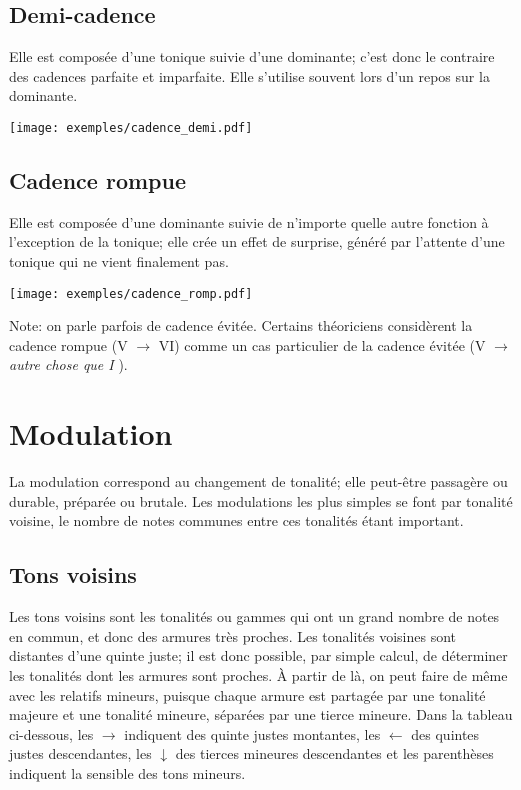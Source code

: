 \documentclass[11pt]{scrreprt}
\begin{document}
\subsection{Demi-cadence}
Elle est composée d'une tonique suivie d'une dominante; c'est donc le contraire des cadences parfaite et imparfaite. Elle s'utilise souvent lors d'un repos sur la dominante.
\begin{center}
   \texttt{[image: exemples/cadence\_demi.pdf]}
\end{center}
\subsection{Cadence rompue}
Elle est composée d'une dominante suivie de n'importe quelle autre fonction à l'exception de la tonique; elle crée un effet de surprise, généré par l'attente d'une tonique qui ne vient finalement pas.
\begin{center}
   \texttt{[image: exemples/cadence\_romp.pdf]}
\end{center}

Note: on parle parfois de cadence évitée. Certains théoriciens considèrent la cadence rompue (V $\to$ VI) comme un cas particulier de la cadence évitée (V $\to$ \emph{autre chose que I} ).
\section{Modulation}
La modulation correspond au changement de tonalité; elle peut-être passagère ou durable, préparée ou brutale. Les modulations les plus simples se font par tonalité voisine, le nombre de notes communes entre ces tonalités étant important.
\subsection{Tons voisins}
Les tons voisins sont les tonalités ou gammes qui ont un grand nombre de notes en commun, et donc des armures très proches. Les tonalités voisines sont distantes d'une quinte juste; il est donc possible, par simple calcul, de déterminer les tonalités dont les armures sont proches. À partir de là, on peut faire de même avec les relatifs mineurs, puisque chaque armure est partagée par une tonalité majeure et une tonalité mineure, séparées par une tierce mineure. Dans la tableau ci-dessous, les $\to$ indiquent des quinte justes montantes, les $\leftarrow$ des quintes justes descendantes, les $\downarrow$ des tierces mineures descendantes et les parenthèses indiquent la sensible des tons mineurs.
\end{document}
